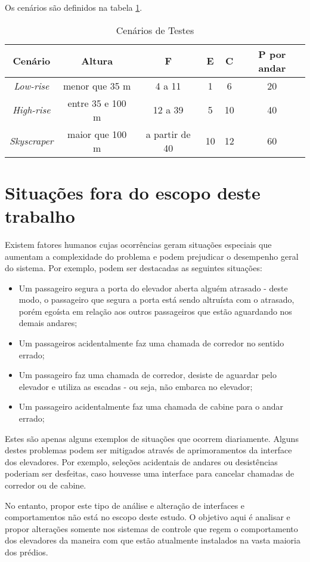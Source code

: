 Os cenários são definidos na tabela \ref{tab:cenarios}.

\begin{table}[htb!]
\centering
\caption{Cenários de Testes}
\label{tab:cenarios}
\begin{tabular}{|c|c|c|c|c|c|}
\hline
{\bf Cenário} & {\bf Altura} & {\bf F}  & {\bf E} & {\bf C} & {\bf P por andar}
\\ \hline
{\it Low-rise}   & menor que 35 m    & 4 a 11         & 1  & 6  & 20 \\ \hline
{\it High-rise}  & entre 35 e 100 m  & 12 a 39        & 5  & 10 & 40 \\ \hline
{\it Skyscraper} & maior que 100 m   & a partir de 40 & 10 & 12 & 60 \\ \hline
\end{tabular}
\end{table}

\section{\label{section:difficulties}Situações fora do escopo deste trabalho}

Existem fatores humanos cujas ocorrências geram situações especiais que aumentam
a complexidade do problema e podem prejudicar o desempenho geral do sistema. Por
exemplo, podem ser destacadas as seguintes situações:

\begin{itemize}
  \item Um passageiro segura a porta do elevador aberta alguém atrasado - deste
        modo, o passageiro que segura a porta está sendo altruísta com o
        atrasado, porém egoísta em relação aos outros passageiros que estão
        aguardando nos demais andares;
  \item Um passageiros acidentalmente faz uma chamada de corredor no sentido
        errado;
  \item Um passageiro faz uma chamada de corredor, desiste de aguardar pelo
        elevador e utiliza as escadas - ou seja, não embarca no elevador;
  \item Um passageiro acidentalmente faz uma chamada de cabine para o andar
        errado;
\end{itemize}

Estes são apenas alguns exemplos de situações que ocorrem diariamente. Alguns
destes problemas podem ser mitigados através de aprimoramentos da interface dos
elevadores. Por exemplo, seleções acidentais de andares ou desistências poderiam
ser desfeitas, caso houvesse uma interface para cancelar chamadas de corredor ou
de cabine.

No entanto, propor este tipo de análise e alteração de interfaces e
comportamentos não está no escopo deste estudo. O objetivo aqui é analisar e
propor alterações somente nos sistemas de controle que regem o comportamento dos
elevadores da maneira com que estão atualmente instalados na vasta maioria dos
prédios.
